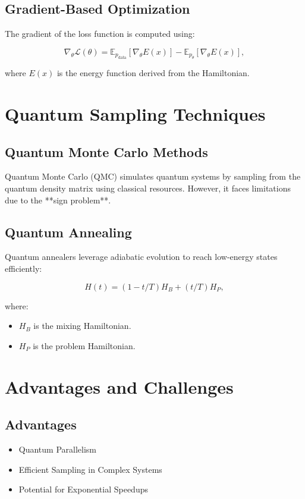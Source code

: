 \documentclass[11pt]{article}
\begin{document}
\subsection{Gradient-Based Optimization}
The gradient of the loss function is computed using:

\begin{equation}
    \nabla_\theta \mathcal{L}(\theta) = \mathbb{E}_{p_{\text{data}}}[\nabla_\theta E(x)] - \mathbb{E}_{p_{\theta}}[\nabla_\theta E(x)],
\end{equation}

where \( E(x) \) is the energy function derived from the Hamiltonian.

\section{Quantum Sampling Techniques}
\subsection{Quantum Monte Carlo Methods}
Quantum Monte Carlo (QMC) simulates quantum systems by sampling from the quantum density matrix using classical resources. However, it faces limitations due to the **sign problem**.

\subsection{Quantum Annealing}
Quantum annealers leverage adiabatic evolution to reach low-energy states efficiently:

\begin{equation}
    H(t) = (1 - t/T) H_B + (t/T) H_P,
\end{equation}

where:
\begin{itemize}
    \item \( H_B \) is the mixing Hamiltonian.
    \item \( H_P \) is the problem Hamiltonian.
\end{itemize}

\section{Advantages and Challenges}
\subsection{Advantages}
\begin{itemize}
    \item Quantum Parallelism
    \item Efficient Sampling in Complex Systems
    \item Potential for Exponential Speedups
\end{itemize}
\end{document}
